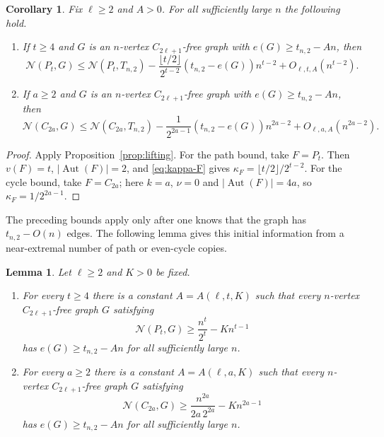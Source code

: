 \documentclass[11pt]{article}
\newtheorem{lemma}[theorem]{Lemma}
\newtheorem{corollary}[theorem]{Corollary}
\theoremstyle{definition}
\theoremstyle{plain}
\theoremstyle{remark}
\theoremstyle{plain}
\numberwithin{equation}{section}
\DeclareMathOperator{\Aut}{Aut}
\newcommand{\N}{\mathcal N}
\begin{document}
\begin{corollary}\label{cor:global-defects}
Fix $\ell\ge2$ and $A>0$. For all sufficiently large $n$ the following hold.
\begin{enumerate}[label=\textup{(\roman*)}]
\item If $t\ge4$ and $G$ is an $n$-vertex $C_{2\ell+1}$-free graph with $e(G)\ge t_{n,2}-An$, then
\[
        \N(P_t,G)\le \N(P_t,T_{n,2})-
        \frac{\lfloor t/2\rfloor}{2^{t-2}}(t_{n,2}-e(G))n^{t-2}
        +O_{\ell,t,A}(n^{t-2}).
\]
\item If $a\ge2$ and $G$ is an $n$-vertex $C_{2\ell+1}$-free graph with $e(G)\ge t_{n,2}-An$, then
\[
        \N(C_{2a},G)\le \N(C_{2a},T_{n,2})-
        \frac{1}{2^{2a-1}}(t_{n,2}-e(G))n^{2a-2}+O_{\ell,a,A}(n^{2a-2}).
\]
\end{enumerate}
\end{corollary}

\begin{proof}
Apply Proposition~\ref{prop:lifting}. For the path bound, take $F=P_t$. Then $v(F)=t$, $|\Aut(F)|=2$, and \eqref{eq:kappa-F} gives $\kappa_F=\lfloor t/2\rfloor/2^{t-2}$. For the cycle bound, take $F=C_{2a}$; here $k=a$, $\nu=0$ and $|\Aut(F)|=4a$, so $\kappa_F=1/2^{2a-1}$.
\end{proof}

The preceding bounds apply only after one knows that the graph has $t_{n,2}-O(n)$ edges. The following lemma gives this initial information from a near-extremal number of path or even-cycle copies.

\begin{lemma}\label{lem:spectral-init}
Let $\ell\ge2$ and $K>0$ be fixed.
\begin{enumerate}[label=\textup{(\roman*)}]
\item For every $t\ge4$ there is a constant $A=A(\ell,t,K)$ such that every $n$-vertex $C_{2\ell+1}$-free graph $G$ satisfying
\[
        \N(P_t,G)\ge \frac{n^t}{2^t}-Kn^{t-1}
\]
has $e(G)\ge t_{n,2}-An$ for all sufficiently large $n$.
\item For every $a\ge2$ there is a constant $A=A(\ell,a,K)$ such that every $n$-vertex $C_{2\ell+1}$-free graph $G$ satisfying
\[
        \N(C_{2a},G)\ge \frac{n^{2a}}{2a\,2^{2a}}-Kn^{2a-1}
\]
has $e(G)\ge t_{n,2}-An$ for all sufficiently large $n$.
\end{enumerate}
\end{lemma}
\end{document}
